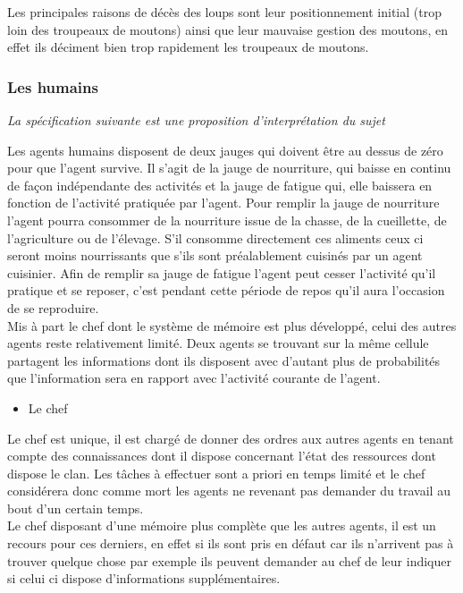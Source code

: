 \documentclass[12pt]{article}
\begin{document}
\begin{itemize}
Les principales raisons de décès des loups sont leur positionnement initial 
(trop loin des troupeaux de moutons) ainsi que leur mauvaise gestion des 
moutons, en effet ils déciment bien trop rapidement les troupeaux de moutons.\\

		\subsubsection{Les humains}

\textit{La spécification suivante est une proposition d'interprétation du 
sujet\\}

Les agents humains disposent de deux jauges qui doivent être au dessus de 
zéro pour que l'agent survive. Il s'agit de la jauge de nourriture, qui baisse 
en continu de façon indépendante des activités et la jauge de fatigue qui, 
elle baissera en fonction de l'activité pratiquée par l'agent. Pour remplir 
la jauge de nourriture l'agent pourra consommer de la nourriture issue de la 
chasse, de la cueillette, de l'agriculture ou de l'élevage. S'il consomme 
directement ces aliments ceux ci seront moins nourrissants que s'ils sont 
préalablement cuisinés par un agent cuisinier. Afin de remplir sa jauge de 
fatigue l'agent peut cesser l'activité qu'il pratique et se reposer, c'est 
pendant cette période de repos qu'il aura l'occasion de se reproduire.\\

Mis à part le chef dont le système de mémoire est plus développé, celui des 
autres agents reste relativement limité. Deux agents se trouvant sur la même 
cellule partagent les informations dont ils disposent avec d'autant plus de 
probabilités que l'information sera en rapport avec l'activité courante de 
l'agent.

		\begin{itemize}
		\item Le chef\\
		\end{itemize}

Le chef est unique, il est chargé de donner des ordres aux autres agents en 
tenant compte des connaissances dont il dispose concernant l'état des 
ressources dont dispose le clan. Les tâches à effectuer sont a priori en temps 
limité et le chef considérera donc comme mort les agents ne revenant pas 
demander du travail au bout d'un certain temps.\\

Le chef disposant d'une mémoire plus complète que les autres agents, il est un 
recours pour ces derniers, en effet si ils sont pris en défaut car ils 
n'arrivent pas à trouver quelque chose par exemple ils peuvent demander au 
chef de leur indiquer si celui ci dispose d'informations supplémentaires.\\


\end{itemize}
\end{document}
